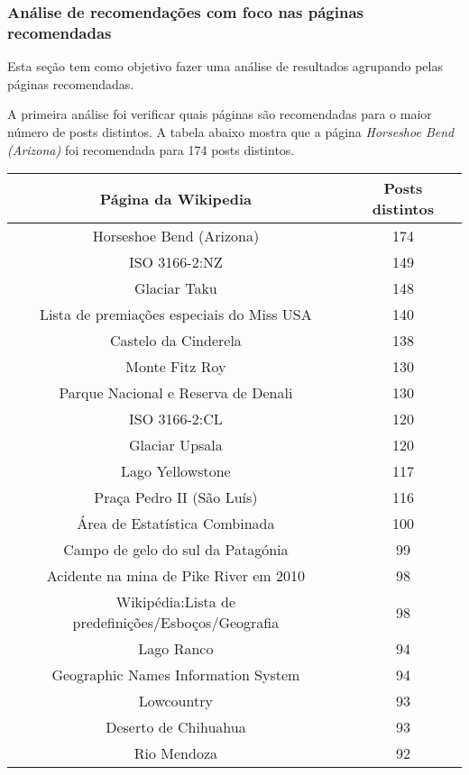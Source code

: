 \subsubsection{Análise de recomendações com foco nas páginas recomendadas}

Esta seção tem como objetivo fazer uma análise de resultados agrupando pelas páginas recomendadas.

A primeira análise foi verificar quais páginas são recomendadas para o maior número de posts distintos. A tabela abaixo 
mostra que a página \textit{Horseshoe Bend (Arizona)} foi recomendada para 174 posts distintos.

\begin{center}
    \begin{tabular}{|c|c|}
        \hline
        \textbf{Página da Wikipedia} & \textbf{Posts distintos} \\
        \hline
        Horseshoe Bend (Arizona) & 174 \\
        \hline
        ISO 3166-2:NZ & 149 \\
        \hline
        Glaciar Taku & 148 \\
        \hline
        Lista de premiações especiais do Miss USA & 140 \\
        \hline
        Castelo da Cinderela & 138 \\
        \hline
        Monte Fitz Roy & 130 \\
        \hline
        Parque Nacional e Reserva de Denali & 130 \\
        \hline
        ISO 3166-2:CL & 120 \\
        \hline
        Glaciar Upsala & 120 \\
        \hline
        Lago Yellowstone & 117 \\
        \hline
        Praça Pedro II (São Luís) & 116 \\
        \hline
        Área de Estatística Combinada & 100 \\
        \hline
        Campo de gelo do sul da Patagónia & 99 \\
        \hline
        Acidente na mina de Pike River em 2010 & 98 \\
        \hline
        Wikipédia:Lista de predefinições/Esboços/Geografia & 98 \\
        \hline
        Lago Ranco & 94 \\
        \hline
        Geographic Names Information System & 94 \\
        \hline
        Lowcountry & 93 \\
        \hline
        Deserto de Chihuahua & 93 \\
        \hline
        Rio Mendoza & 92 \\
        \hline
    \end{tabular}
\end{center}

